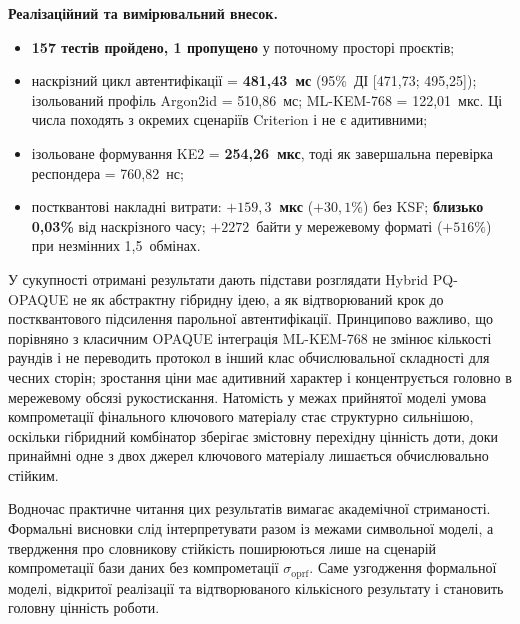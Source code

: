 \documentclass{llncs}
\newcommand{\sigoprf}{\sigma_{\mathrm{oprf}}}
\begin{document}
\textbf{Реалізаційний та вимірювальний внесок.}
\begin{itemize}
  \item \textbf{157 тестів пройдено, 1 пропущено} у поточному просторі проєктів;
  \item наскрізний цикл автентифікації = \textbf{481,43~мс}
        (95\%~ДІ [471,73; 495,25]); ізольований профіль Argon2id =
        510,86~мс; ML-KEM-768 = 122,01~мкс. Ці числа походять з окремих сценаріїв
        Criterion і не є адитивними;
  \item ізольоване формування KE2 = \textbf{254,26~мкс},
        тоді як завершальна перевірка респондера = 760,82~нс;
  \item постквантові накладні витрати: \textbf{$+159{,}3$~мкс} ($+30{,}1\%$)
        без KSF; \textbf{близько 0,03\%} від наскрізного часу;
        $+2272$~байти у мережевому форматі ($+516\%$) при незмінних 1,5~обмінах.
\end{itemize}

У сукупності отримані результати дають підстави розглядати Hybrid
PQ-OPAQUE не як абстрактну гібридну ідею, а як відтворюваний крок до
постквантового підсилення парольної автентифікації. Принципово
важливо, що порівняно з класичним OPAQUE інтеграція ML-KEM-768 не
змінює кількості раундів і не переводить протокол в інший клас
обчислювальної складності для чесних сторін; зростання ціни має
адитивний характер і концентрується головно в мережевому обсязі
рукостискання. Натомість у межах прийнятої моделі умова компрометації
фінального ключового матеріалу стає структурно сильнішою, оскільки
гібридний комбінатор зберігає змістовну перехідну цінність доти, доки
принаймні одне з двох джерел ключового матеріалу лишається
обчислювально стійким.

Водночас практичне читання цих результатів вимагає академічної
стриманості. Формальні висновки слід інтерпретувати разом із межами
символьної моделі, а твердження про словникову стійкість поширюються
лише на сценарій компрометації бази даних без компрометації
$\sigoprf$. Саме узгодження формальної моделі, відкритої реалізації та
відтворюваного кількісного результату і становить головну цінність
роботи.
\end{document}
